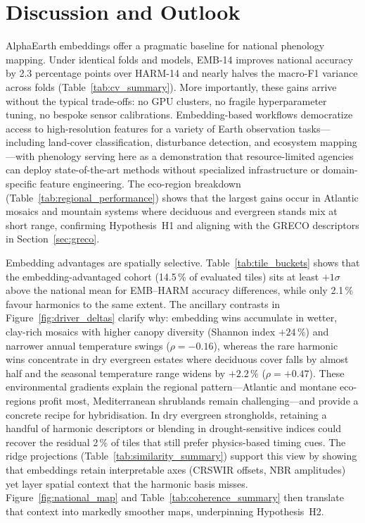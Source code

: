 \documentclass[utf8]{FrontiersinHarvard}
\begin{document}
\section{Discussion and Outlook}

AlphaEarth embeddings \citep{AlphaEarth2025} offer a pragmatic baseline for national phenology mapping. Under identical folds and models, EMB-14 improves national accuracy by 2.3 percentage points over HARM-14 and nearly halves the macro-F1 variance across folds (Table~\ref{tab:cv_summary}). More importantly, these gains arrive without the typical trade-offs: no GPU clusters, no fragile hyperparameter tuning, no bespoke sensor calibrations. Embedding-based workflows democratize access to high-resolution features for a variety of Earth observation tasks—including land-cover classification, disturbance detection, and ecosystem mapping—with phenology serving here as a demonstration that resource-limited agencies can deploy state-of-the-art methods without specialized infrastructure or domain-specific feature engineering. The eco-region breakdown (Table~\ref{tab:regional_performance}) shows that the largest gains occur in Atlantic mosaics and mountain systems where deciduous and evergreen stands mix at short range, confirming Hypothesis~H1 and aligning with the GRECO descriptors in Section~\ref{sec:greco}.

Embedding advantages are spatially selective. Table~\ref{tab:tile_buckets} shows that the embedding-advantaged cohort (14.5\,\% of evaluated tiles) sits at least \(+1\sigma\) above the national mean for EMB--HARM accuracy differences, while only 2.1\,\% favour harmonics to the same extent. The ancillary contrasts in Figure~\ref{fig:driver_deltas} clarify why: embedding wins accumulate in wetter, clay-rich mosaics with higher canopy diversity (Shannon index \(+24\,\%\)) and narrower annual temperature swings (\(\rho=-0.16\)), whereas the rare harmonic wins concentrate in dry evergreen estates where deciduous cover falls by almost half and the seasonal temperature range widens by \(+2.2\,\%\) (\(\rho=+0.47\)). These environmental gradients explain the regional pattern—Atlantic and montane eco-regions profit most, Mediterranean shrublands remain challenging—and provide a concrete recipe for hybridisation. In dry evergreen strongholds, retaining a handful of harmonic descriptors or blending in drought-sensitive indices could recover the residual 2\,\% of tiles that still prefer physics-based timing cues. The ridge projections (Table~\ref{tab:similarity_summary}) support this view by showing that embeddings retain interpretable axes (CRSWIR offsets, NBR amplitudes) yet layer spatial context that the harmonic basis misses. Figure~\ref{fig:national_map} and Table~\ref{tab:coherence_summary} then translate that context into markedly smoother maps, underpinning Hypothesis~H2.
\end{document}
